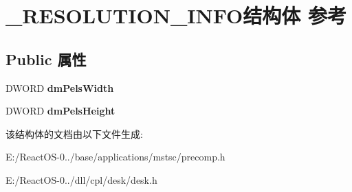 \hypertarget{struct___r_e_s_o_l_u_t_i_o_n___i_n_f_o}{}\section{\+\_\+\+R\+E\+S\+O\+L\+U\+T\+I\+O\+N\+\_\+\+I\+N\+F\+O结构体 参考}
\label{struct___r_e_s_o_l_u_t_i_o_n___i_n_f_o}
\subsection*{Public 属性}
\begin{DoxyCompactItemize}
\item 
\mbox{\label{struct___r_e_s_o_l_u_t_i_o_n___i_n_f_o_a3cce495126ad0b3e233d0bf2d779d2db}} 
D\+W\+O\+RD {\bfseries dm\+Pels\+Width}
\item 
\mbox{\label{struct___r_e_s_o_l_u_t_i_o_n___i_n_f_o_ab9bfbb6c6961c51c466d4f79ad958926}} 
D\+W\+O\+RD {\bfseries dm\+Pels\+Height}
\end{DoxyCompactItemize}


该结构体的文档由以下文件生成\+:\begin{DoxyCompactItemize}
\item 
E\+:/\+React\+O\+S-\/0../base/applications/mstsc/precomp.\+h\item 
E\+:/\+React\+O\+S-\/0../dll/cpl/desk/desk.\+h\end{DoxyCompactItemize}
